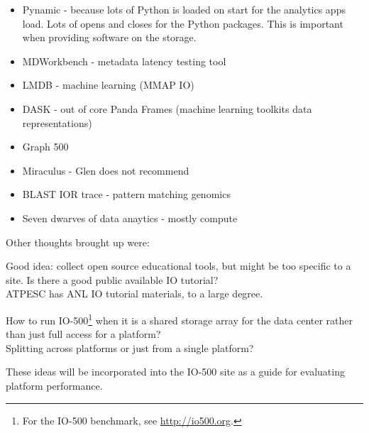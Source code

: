 \documentclass{llncs}
\begin{document}
\begin{itemize}
\item Pynamic - because lots of Python is loaded on start for the analytics apps load.
Lots of opens and closes for the Python packages. This is important when providing software on the storage.
\item MDWorkbench - metadata latency testing tool
\item LMDB - machine learning (MMAP IO)
\item DASK - out of core Panda Frames (machine learning toolkits data representations)
\item  Graph 500
\item  Miraculus - Glen does not recommend
\item BLAST IOR trace - pattern matching genomics
\item Seven dwarves of data anaytics - mostly compute
\end{itemize}
Other thoughts brought up were:

Good idea: collect open source educational tools, but might be too specific to a site.
Is there a good public available IO tutorial?\\
ATPESC has ANL IO tutorial materials, to a large degree.

How to run IO-500\footnote{For the IO-500 benchmark, see \url{http://io500.org}.} when it is a shared storage array for the data center rather than just full access for a platform?\\
Splitting across platforms or just from a single platform?

These ideas will be incorporated into the IO-500 site as a guide for evaluating platform performance.



{}
\end{document}
